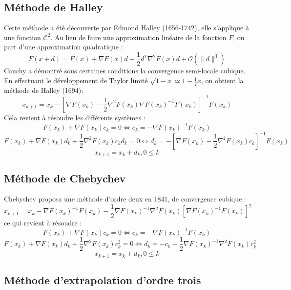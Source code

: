 \subsection{M\'ethode de Halley}
Cette m\'ethode a \'et\'e d\'ecouverte par Edmond Halley (1656-1742), elle s'applique \`a une fonction $\mathcal{C}^2$.
Au lieu de faire une approximation lin\'eaire de la fonction $F$, on part d'une approximation quadratique :
$$F(x+d)=F(x)+\nabla F(x)d + \frac{1}{2}d^T\nabla^2F(x)d + \mathcal{O}({\lVert d\rVert^3}) $$
Cauchy a d\'emontr\'e sous certaines conditions la convergence semi-locale cubique.
En effectuant le d\'eveloppement de Taylor limit\'e $\sqrt{1-x}\simeq 1-\frac{1}{2}x $, on obtient la m\'ethode de Halley (1694):
$$x_{k+1}=x_k-[\nabla F(x_k)-\frac{1}{2}\nabla^2F(x_k)\nabla F(x_k)^{-1}F(x_k)]^{-1}F(x_k)$$
%
Cela revient \`a r\'esoudre les diff\'erents syst\`emes :
$$F(x_k)+\nabla F(x_k)c_k=0 \Leftrightarrow c_k=-\nabla F(x_k)^{-1}F(x_k)$$
$$F(x_k)+\nabla F(x_k)d_k+\frac{1}{2}\nabla^2F(x_k)c_kd_k=0  \Leftrightarrow  d_k=-[\nabla F(x_k)-\frac{1}{2}\nabla^2F(x_k)c_k]^{-1}F(x_k)$$
$$x_{k+1}=x_k+d_k, 0\leq k$$



\subsection{M\'ethode de Chebychev}


Chebyshev proposa une m\'ethode d'ordre deux en 1841, de convergence cubique :
\begin{equation}
x_{k+1}=x_k-\nabla F(x_k)^{-1}F(x_k)-\frac{1}{2}\nabla F(x_k)^{-1}\nabla^2F(x_k)[\nabla F(x_k)^{-1}F(x_k)]^2
\label{equ:cheb}
\end{equation}
ce qui revient \`a r\'esoudre :
$$F(x_k)+\nabla F(x_k)c_k=0 \Leftrightarrow c_k=-\nabla F(x_k)^{-1}F(x_k)$$
$$F(x_k)+\nabla F(x_k)d_k+\frac{1}{2}\nabla^2F(x_k)c_k^2=0 \Leftrightarrow  d_k=-c_k-\frac{1}{2}\nabla F(x_k)^{-1}\nabla^2F(x_k)c_k^2$$
$$x_{k+1}=x_k+d_k, 0\leq k$$




\subsection{M\'ethode d'extrapolation d'ordre trois}


